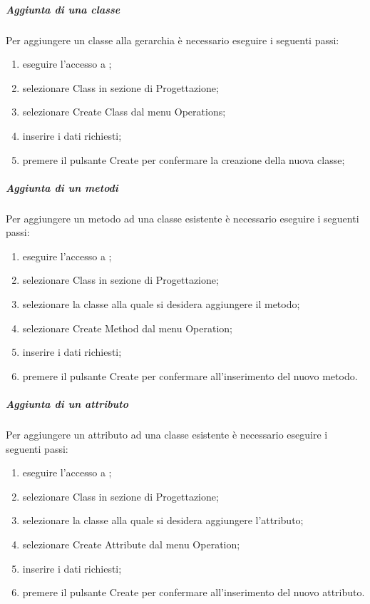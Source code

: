 \documentclass[12pt,a4paper]{article}
\begin{document}
\subparagraph{Aggiunta di una classe}

Per aggiungere un classe alla gerarchia è necessario eseguire i seguenti passi:
\begin{enumerate}
	\item eseguire l'accesso a ;
	\item selezionare Class in sezione di Progettazione; 
	\item selezionare Create Class dal menu Operations;
	\item inserire i dati richiesti;
	\item premere il pulsante Create per confermare la creazione della nuova classe;
\end{enumerate}

\subparagraph{Aggiunta di un metodi}

Per aggiungere un metodo ad una classe esistente è necessario eseguire i seguenti passi:
\begin{enumerate}
	\item eseguire l'accesso a ;
	\item selezionare Class in sezione di Progettazione; 
	\item selezionare la classe alla quale si desidera aggiungere il metodo;
	\item selezionare Create Method dal menu Operation;
	\item inserire i dati richiesti;
	\item premere il pulsante Create per confermare all'inserimento del nuovo metodo.
\end{enumerate}

\subparagraph{Aggiunta di un attributo}

Per aggiungere un attributo ad una classe esistente è necessario eseguire i seguenti passi:
\begin{enumerate}
	\item eseguire l'accesso a ;
	\item selezionare Class in sezione di Progettazione; 
	\item selezionare la classe alla quale si desidera aggiungere l'attributo;
	\item selezionare Create Attribute dal menu Operation;
	\item inserire i dati richiesti;
	\item premere il pulsante Create per confermare all'inserimento del nuovo attributo.
\end{enumerate}
\end{document}
